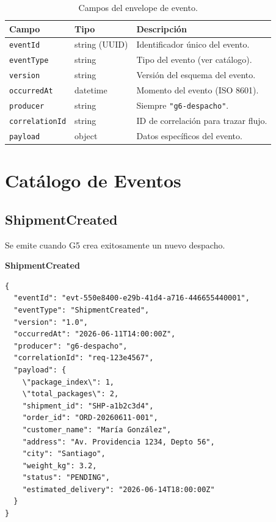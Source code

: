 \documentclass[11pt, a4paper]{article}
\newcommand{\contractheader}[1]{%
  \noindent\colorbox{primary!10}{%
    \parbox{\dimexpr\textwidth-2\fboxsep}{%
      \textbf{\faFileCode\quad #1}%
    }%
  }
  \vspace{0.3cm}
}
\begin{document}
\begin{table}[h!]
\centering
\renewcommand{\arraystretch}{1.3}
\begin{tabularx}{\textwidth}{l l X}
  \toprule
  \textbf{Campo} & \textbf{Tipo} & \textbf{Descripción} \\
  \midrule
  \texttt{eventId}       & string (UUID) & Identificador único del evento. \\
  \texttt{eventType}     & string        & Tipo del evento (ver catálogo). \\
  \texttt{version}       & string        & Versión del esquema del evento. \\
  \texttt{occurredAt}    & datetime      & Momento del evento (ISO 8601). \\
  \texttt{producer}      & string        & Siempre \texttt{"g6-despacho"}. \\
  \texttt{correlationId} & string        & ID de correlación para trazar flujo. \\
  \texttt{payload}       & object        & Datos específicos del evento. \\
  \bottomrule
\end{tabularx}
\caption{Campos del envelope de evento.}
\end{table}


\section{Catálogo de Eventos}

\subsection{ShipmentCreated}

Se emite cuando G5 crea exitosamente un nuevo despacho.

\contractheader{ShipmentCreated}

\begin{lstlisting}
{
  "eventId": "evt-550e8400-e29b-41d4-a716-446655440001",
  "eventType": "ShipmentCreated",
  "version": "1.0",
  "occurredAt": "2026-06-11T14:00:00Z",
  "producer": "g6-despacho",
  "correlationId": "req-123e4567",
  "payload": {
    \"package_index\": 1,
    \"total_packages\": 2,
    "shipment_id": "SHP-a1b2c3d4",
    "order_id": "ORD-20260611-001",
    "customer_name": "María González",
    "address": "Av. Providencia 1234, Depto 56",
    "city": "Santiago",
    "weight_kg": 3.2,
    "status": "PENDING",
    "estimated_delivery": "2026-06-14T18:00:00Z"
  }
}
\end{lstlisting}
\end{document}
